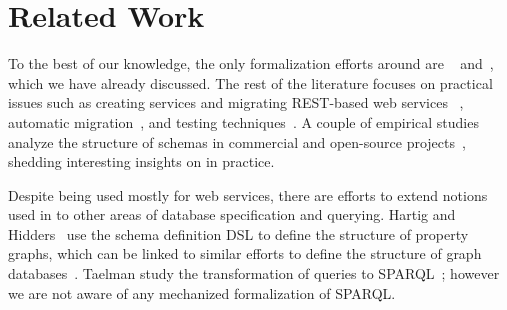 \section{Related Work}\label{sec:related}

To the best of our knowledge, the only formalization efforts around \gql are \HP~\cite{gqlph} and~\cite{olafschema}, which we have already discussed. The rest of the \gql literature focuses on practical issues such as creating \gql services and migrating REST-based web services \gql~\cite{improvingoeeu, ehriapi, gqlexperiences}, automatic migration~\cite{migratingapi}, and testing techniques~\cite{gqldeviation}. A couple of empirical studies analyze the structure of \gql schemas in commercial and open-source projects~\cite{empiricalgql, empiricalapi}, shedding interesting insights on \gql in practice.

Despite being used mostly for web services, there are efforts to extend notions used in \gql to other areas of database specification and querying. Hartig and Hidders~\cite{olafschema} use the \gql schema definition DSL to define the structure of property graphs, which can be linked to similar efforts to define the structure of graph databases~\cite{schemaval}. Taelman \etal study the transformation of \gql queries to SPARQL~\cite{gqlsparql}; however we are not aware of any mechanized formalization of SPARQL.

